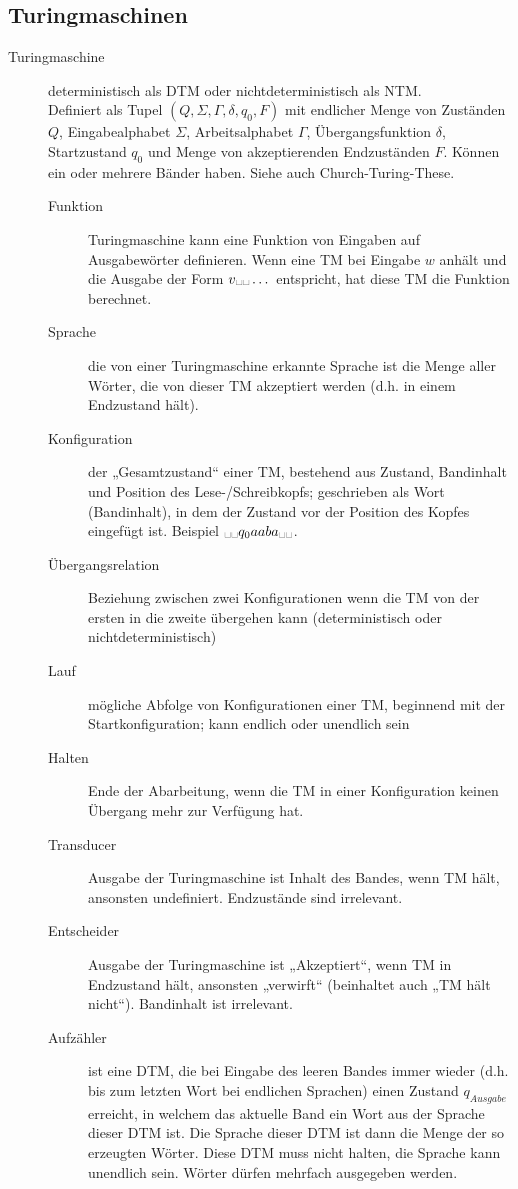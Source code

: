 \subsection{Turingmaschinen}
    \begin{description}
        \item[Turingmaschine] deterministisch als DTM oder nichtdeterministisch als NTM. \\
            Definiert als Tupel $(Q,\Sigma,\Gamma,\delta,q_0,F)$ mit endlicher Menge von Zuständen $Q$, Eingabealphabet $\Sigma$, Arbeitsalphabet $\Gamma$, Übergangsfunktion $\delta$, Startzustand $q_0$ und Menge von akzeptierenden Endzuständen $F$. Können ein oder mehrere Bänder haben. Siehe auch Church-Turing-These.  

            \begin{description}
                \item[Funktion] Turingmaschine kann eine Funktion von Eingaben auf Ausgabewörter definieren. Wenn eine TM bei Eingabe $w$ anhält und die Ausgabe der Form $v\blank\blank\dots$ entspricht, hat diese TM die Funktion berechnet.
                \item[Sprache] die von einer Turingmaschine erkannte Sprache ist die Menge aller Wörter, die von dieser TM akzeptiert werden (d.h. in einem Endzustand hält).

                \item[Konfiguration]
                    der „Gesamtzustand“ einer TM, bestehend aus Zustand, Bandinhalt und Position des Lese-/Schreibkopfs;
                    geschrieben als Wort (Bandinhalt), in dem der Zustand vor der Position des Kopfes eingefügt ist. Beispiel $ \blank\blank q_0aaba \blank\blank$.
                \item[Übergangsrelation]
                    Beziehung zwischen zwei Konfigurationen wenn die TM von der ersten in die zweite übergehen kann
                    (deterministisch oder nichtdeterministisch)
                \item[Lauf] mögliche Abfolge von Konfigurationen einer TM, beginnend mit der Startkonfiguration; kann endlich oder unendlich sein
                \item[Halten] Ende der Abarbeitung, wenn die TM in einer Konfiguration keinen Übergang mehr zur Verfügung hat.

                \item[Transducer] Ausgabe der Turingmaschine ist Inhalt des Bandes, wenn TM hält, ansonsten undefiniert. Endzustände sind irrelevant.
                \item[Entscheider] Ausgabe der Turingmaschine ist „Akzeptiert“, wenn TM in Endzustand hält, ansonsten „verwirft“ (beinhaltet auch „TM hält nicht“). Bandinhalt ist irrelevant.
                \item[Aufzähler] ist eine DTM, die bei Eingabe des leeren Bandes immer wieder (d.h. bis zum letzten Wort bei endlichen Sprachen) einen Zustand $q_{Ausgabe}$ erreicht, in welchem das aktuelle Band ein Wort aus der Sprache dieser DTM ist. Die Sprache dieser DTM ist dann die Menge der so erzeugten Wörter. Diese DTM muss nicht halten, die Sprache kann unendlich sein. Wörter dürfen mehrfach ausgegeben werden.


\end{description}
\end{description}

